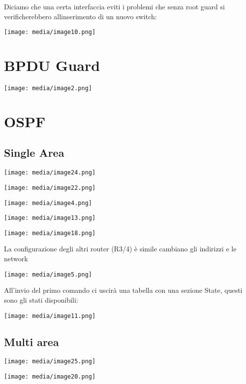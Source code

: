 Diciamo che una certa interfaccia eviti i problemi che senza root guard
si verificherebbero all\textquotesingle inserimento di un nuovo switch:

\texttt{[image: media/image10.png]}

\section{BPDU Guard}\label{bpdu-guard}

\texttt{[image: media/image2.png]}

\section{OSPF}\label{ospf}

\subsection{Single Area}\label{single-area}

\texttt{[image: media/image24.png]}

\texttt{[image: media/image22.png]}

\texttt{[image: media/image4.png]}

\texttt{[image: media/image13.png]}

\texttt{[image: media/image18.png]}

La configurazione degli altri router (R3/4) è simile cambiano gli
indirizzi e le network

\texttt{[image: media/image5.png]}

All'invio del primo comando ci uscirà una tabella con una sezione State,
questi sono gli stati disponibili:

\texttt{[image: media/image11.png]}

\subsection{Multi area}\label{multi-area}

\texttt{[image: media/image25.png]}

\texttt{[image: media/image20.png]}


